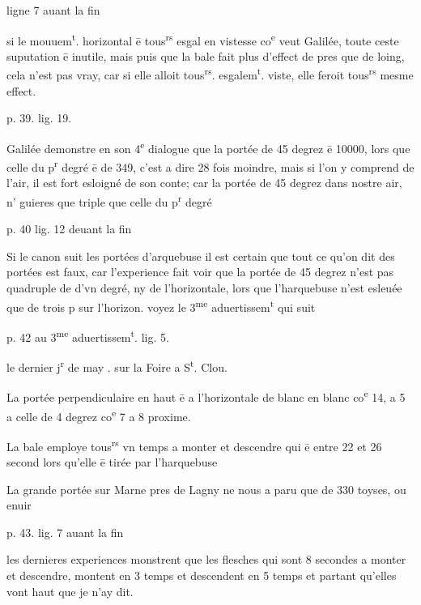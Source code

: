 \documentclass[11pt,a4paper]{article}
\begin{document}
ligne 7 auant la fin

si le mouuem\textsuperscript{t}. horizontal ē tous\textsuperscript{rs} esgal en vistesse co\textsuperscript{e} veut Galilée, toute ceste suputation ē inutile, mais puis que la bale fait plus d'effect de pres que de loing, cela n'est pas vray, car si elle alloit tous\textsuperscript{rs}. esgalem\textsuperscript{t}. viste, elle feroit tous\textsuperscript{rs} mesme effect.

p. 39. lig. 19.

Galilée demonstre en son 4\textsuperscript{e} dialogue que la portée de 45 degrez ē 10000, lors que celle du p\textsuperscript{r} degré ē de 349, c'est a dire 28 fois moindre, mais si l'on y comprend  de l'air, il est fort esloigné de son conte; car la portée de 45 degrez dans nostre air, n' guieres que triple que celle du p\textsuperscript{r} degré

p. 40 lig. 12 deuant la fin

Si le canon suit les portées d'arquebuse il est certain que tout ce qu'on dit des portées est faux, car l'experience fait voir que la portée de 45 degrez n'est pas quadruple de  d'vn degré, ny de l'horizontale, lors que l'harquebuse n'est esleuée que de trois p\ill{} sur l'horizon. voyez le 3\textsuperscript{me} aduertissem\textsuperscript{t} qui suit

p. 42 au 3\textsuperscript{me} aduertissem\textsuperscript{t}. lig. 5.

 le dernier j\textsuperscript{r} de may . sur la Foire a S\textsuperscript{t}. Clou.

La portée perpendiculaire en haut ē a l'horizontale de blanc en blanc co\textsuperscript{e} 14, a 5 \ill{} a celle de 4 degrez co\textsuperscript{e} 7 a 8 proxime.

La bale employe tous\textsuperscript{rs} vn temps a monter et descendre qui ē entre 22 et 26 second lors qu'elle ē tirée par l'harquebuse

La grande portée sur Marne pres de Lagny ne nous a paru que de 330 toyses, ou enuir

p. 43. lig. 7 auant la fin

les dernieres experiences monstrent que les flesches qui sont 8 secondes a monter et descendre, montent en 3 temps et descendent en 5 temps et partant qu'elles vont \ill{} haut que je n'ay dit.
\end{document}
